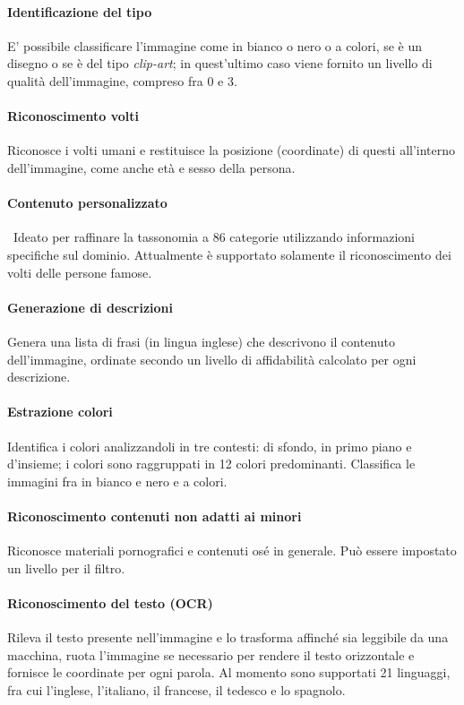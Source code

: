 \documentclass[fleqn,a4paper,11pt]{report}
\begin{document}
\paragraph{Identificazione del tipo} E' possibile classificare l'immagine come in bianco o nero o a colori, se è un disegno o se è del tipo \textit{clip-art}; in quest'ultimo caso viene fornito un livello di qualità dell'immagine, compreso fra 0 e 3.

\paragraph{Riconoscimento volti} Riconosce i volti umani e restituisce la posizione (coordinate) di questi all'interno dell'immagine, come anche età e sesso della persona.

\paragraph{Contenuto personalizzato} Ideato per raffinare la tassonomia a 86 categorie utilizzando informazioni specifiche sul dominio. Attualmente è supportato solamente il riconoscimento dei volti delle persone famose.

\paragraph{Generazione di descrizioni} Genera una lista di frasi (in lingua inglese) che descrivono il contenuto dell'immagine, ordinate secondo un livello di affidabilità calcolato per ogni descrizione.

\paragraph{Estrazione colori} Identifica i colori analizzandoli in tre contesti: di sfondo, in primo piano e d'insieme; i colori sono raggruppati in 12 colori predominanti. Classifica le immagini fra in bianco e nero e a colori.

\paragraph{Riconoscimento contenuti non adatti ai minori} Riconosce materiali pornografici e contenuti osé in generale. Può essere impostato un livello per il filtro.

\paragraph{Riconoscimento del testo (OCR)} Rileva il testo presente nell'immagine e lo trasforma affinché sia leggibile da una macchina, ruota l'immagine se necessario per rendere il testo orizzontale e fornisce le coordinate per ogni parola. Al momento sono supportati 21 linguaggi, fra cui l'inglese, l'italiano, il francese, il tedesco e lo spagnolo.
\end{document}
